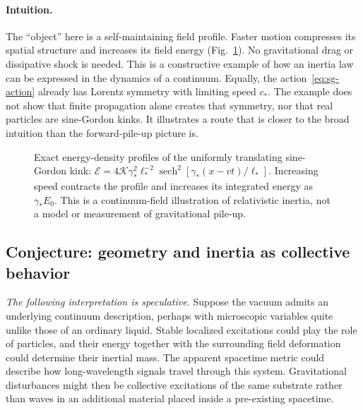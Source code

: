 \documentclass[11pt,a4paper]{article}
\numberwithin{equation}{section}
\begin{document}
\paragraph{Intuition.}
The ``object'' here is a self-maintaining field profile. Faster motion compresses its spatial structure and increases its field energy (Fig.~\ref{fig:kink}). No gravitational drag or dissipative shock is needed. This is a constructive example of how an inertia law can be expressed in the dynamics of a continuum. Equally, the action~\eqref{eq:sg-action} already has Lorentz symmetry with limiting speed $c_*$. The example does not show that finite propagation alone creates that symmetry, nor that real particles are sine-Gordon kinks. It illustrates a route that is closer to the broad intuition than the forward-pile-up picture is.

\begin{figure}[t]
\centering
{}
\caption{Exact energy-density profiles of the uniformly translating sine-Gordon kink: $\mathcal E=4\mathcal K\gamma_*^2\ell_*^{-2}\operatorname{sech}^2[\gamma_*(x-vt)/\ell_*]$. Increasing speed contracts the profile and increases its integrated energy as $\gamma_*E_0$. This is a continuum-field illustration of relativistic inertia, not a model or measurement of gravitational pile-up.}
\label{fig:kink}
\end{figure}

\subsection{Conjecture: geometry and inertia as collective behavior}

\emph{The following interpretation is speculative.} Suppose the vacuum admits an underlying continuum description, perhaps with microscopic variables quite unlike those of an ordinary liquid. Stable localized excitations could play the role of particles, and their energy together with the surrounding field deformation could determine their inertial mass. The apparent spacetime metric could describe how long-wavelength signals travel through this system. Gravitational disturbances might then be collective excitations of the same substrate rather than waves in an additional material placed inside a pre-existing spacetime.
\end{document}
